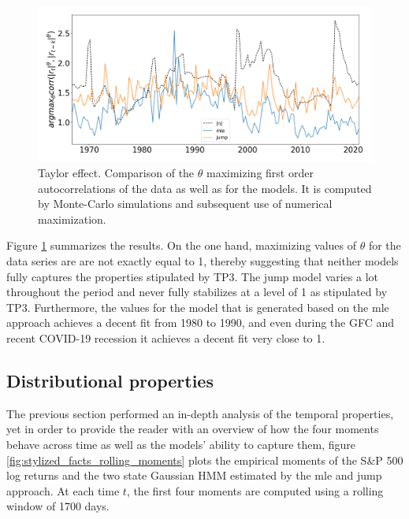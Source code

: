 \begin{figure}[H] 
    \centering
    \includegraphics[width=1.0\textwidth]{analysis/stylized_facts/images/taylor_effect.png}
    \caption{Taylor effect. Comparison of the $\theta$ maximizing first order autocorrelations of the data as well as for the models. It is computed by Monte-Carlo simulations and subsequent use of numerical maximization.}
    \label{fig:stylized_facts_taylor_effect} 
\end{figure}

Figure \ref{fig:stylized_facts_taylor_effect} summarizes the results. On the
one hand, maximizing values of $\theta$ for the data series are are not exactly equal to 1, thereby suggesting that neither models fully captures the properties stipulated by TP3. The jump model varies a lot throughout the period and never fully stabilizes at a level of 1 as stipulated by TP3. Furthermore, the values for the model that is generated based on the mle approach achieves a decent fit from 1980 to 1990, and even during the GFC and recent COVID-19 recession it achieves a decent fit very close to 1.


\subsection{Distributional properties}
\label{Sec: Distributional properties}
The previous section performed an in-depth analysis of the temporal properties, yet in order to provide the reader with an overview of how the four moments behave across time as well as the models' ability to capture them, figure \ref{fig:stylized_facts_rolling_moments} plots the empirical moments of the S\&P 500 log returns and the two state Gaussian HMM estimated by the mle and jump approach. At each time $t$, the first four moments are computed using a rolling window of 1700 days.


